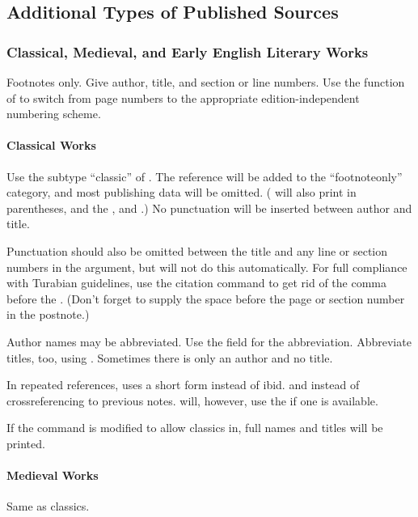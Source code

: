 \documentclass{ltxdockit}[2010/02/12]
\begin{document}
\subsection{Additional Types of Published Sources}

\subsubsection{Classical, Medieval, and Early English Literary Works}
Footnotes only. Give author, title, and section or line numbers. Use the  function of  to switch from page numbers to the appropriate edition-independent numbering scheme.
\paragraph{Classical Works} Use the subtype ``classic'' of . The reference will be added to the ``footnoteonly'' category, and most publishing data will be omitted. ( will also print  in parentheses, and the , and .) No punctuation will be inserted between author and title. \autocites[][]{aristotle:hstanim}

Punctuation should also be omitted between the title and any line or section numbers in the  argument, but  will not do this automatically. For full compliance with Turabian guidelines, use the citation command  to get rid of the comma before the . (Don't forget to supply the space before the page or section number in the postnote.)

Author names may be abbreviated. Use the  field for the abbreviation. Abbreviate titles, too, using .\autocites[With abbreviated title and author:][]{aristotlehistanim} Sometimes there is only an author and no title.

In repeated references,  uses a short form instead of ibid. and instead of crossreferencing to previous notes.  will, however, use the  if one is available.\autocites[][]{aristotlehistanim, aristotle:hstanim}

If the  command is modified to allow classics in, full names and titles will be printed.

\paragraph{Medieval Works} Same as classics.
\end{document}
